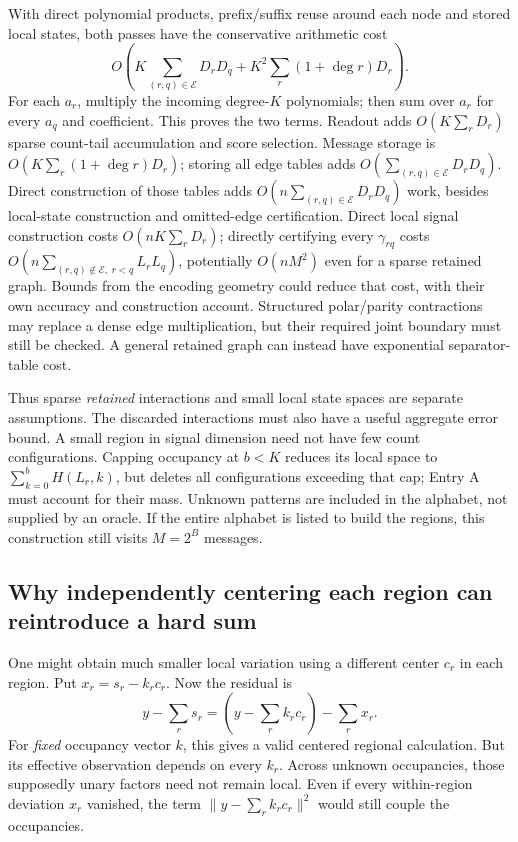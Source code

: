 \documentclass[10pt,a4paper]{article}
\begin{document}
With direct polynomial products, prefix/suffix reuse around each node and stored local states, both passes
have the conservative arithmetic cost
\begin{equation}
 O\!\left(K\sum_{(r,q)\in\mathcal E}D_rD_q
       +K^2\sum_r(1+\deg r)D_r\right).
 \label{eq:region-cost}
\end{equation}
For each $a_r$, multiply the incoming degree-$K$ polynomials; then sum over $a_r$ for every $a_q$ and
coefficient. This proves the two terms. Readout adds $O(K\sum_r D_r)$ sparse count-tail accumulation and
score selection. Message storage is $O(K\sum_r(1+\deg r)D_r)$; storing all edge tables adds
$O(\sum_{(r,q)\in\mathcal E}D_rD_q)$. Direct construction of those tables adds
$O(n\sum_{(r,q)\in\mathcal E}D_rD_q)$ work, besides local-state construction and omitted-edge certification.
Direct local signal construction costs $O(nK\sum_rD_r)$; directly certifying every $\gamma_{rq}$ costs
$O(n\sum_{(r,q)\notin\mathcal E,\ r<q}L_rL_q)$, potentially $O(nM^2)$ even for a sparse retained graph.
Bounds from the encoding geometry could reduce that cost, with their own accuracy and construction account.
Structured polar/parity contractions may replace a dense edge multiplication, but their required joint
boundary must still be checked. A general retained graph can instead have exponential separator-table cost.

Thus sparse \emph{retained} interactions and small local state spaces are separate assumptions. The discarded
interactions must also have a useful aggregate error bound. A small region in signal dimension need not have
few count configurations. Capping occupancy at $b<K$ reduces its local space to
$\sum_{k=0}^bH(L_r,k)$, but deletes all configurations exceeding that cap; Entry A must account for their
mass. Unknown patterns are included in the alphabet, not supplied by an oracle. If the entire alphabet is
listed to build the regions, this construction still visits $M=2^B$ messages.

\subsection{Why independently centering each region can reintroduce a hard sum}
One might obtain much smaller local variation using a different center $c_r$ in each region. Put
$x_r=s_r-k_rc_r$. Now the residual is
\[
 y-\sum_r s_r=\left(y-\sum_r k_rc_r\right)-\sum_r x_r.
\]
For \emph{fixed} occupancy vector $k$, this gives a valid centered regional calculation. But its effective
observation depends on every $k_r$. Across unknown occupancies, those supposedly unary factors need not
remain local. Even if every within-region deviation $x_r$ vanished, the term
$\|y-\sum_r k_rc_r\|^2$ would still couple the occupancies.
\end{document}
